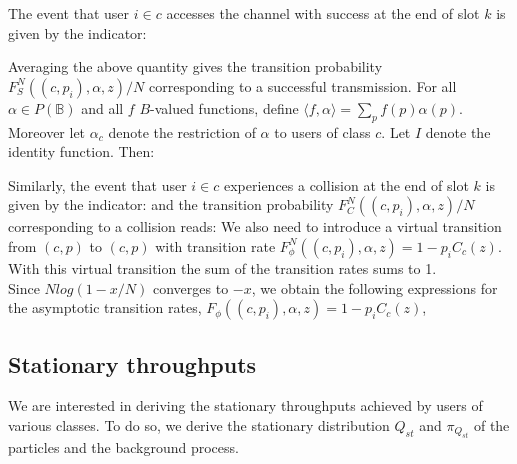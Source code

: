 \documentclass[letterpaper,english,10pt]{article}
\begin{document}
The event that user $i \in c$ accesses the channel with success at the end of slot $k$ is given by the indicator:

Averaging the above quantity gives the transition probability $F_S^N((c, p_i ), \alpha, z)/N$ corresponding to a successful transmission. For all $\alpha \in P(\mathbb{B})$ and all $f$ $B$-valued functions, define $\langle f, \alpha \rangle =  \sum_{p}f(p)\alpha(p)$. Moreover let $\alpha_c$ denote the restriction of $\alpha$ to users of class $c$. Let $I$ denote the identity function. Then:


Similarly, the event that user $i \in c$ experiences a collision at the end of slot $k$ is given by the indicator:
and the transition probability $F_C^N((c, p_i ), \alpha, z)/N$ corresponding to a collision reads:
We also need to introduce a virtual transition from $(c, p)$ to $(c, p)$ with transition rate $F^N_{\phi}((c, p_i), \alpha, z) = 1 - p_iC_c(z)$. 
With this virtual transition the sum of the transition rates sums to 1.\\

Since $Nlog(1-x/N)$ converges to $-x$, we obtain the following expressions for the asymptotic transition rates, $F_\phi((c, p_i), \alpha, z) = 1 - p_iC_c(z)$,

\subsection{Stationary throughputs}We are interested in deriving the stationary throughputs achieved by users of various classes. 
To do so, we derive the stationary distribution $Q_{st}$ and $\pi_{Q_{st}}$ of the particles and the background process.\\
\end{document}
